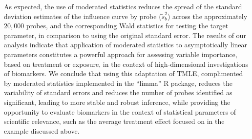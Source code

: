 As expected, the use of moderated statistics reduces the spread of the standard
deviation estimates of the influence curve by probe ($\tilde{s}^2_b$) across the
approximately $20,000$ probes, and the corresponding Wald statistics for testing
the target parameter, in comparison to using the original standard error. The
results of our analysis indicate that application of moderated statistics to
asymptotically linear parameters constitutes a powerful approach for assessing
variable importance, based on treatment or exposure, in the context of
high-dimensional investigations of biomarkers. We conclude that using this
adaptation of TMLE, complimented by moderated statistics implemented in the
``limma'' R package, reduces the variability of standard errors and reduces the
number of probes identified as significant, leading to more stable and robust
inference, while providing the opportunity to evaluate biomarkers in the context
of statistical parameters of scientific relevance, such as the average treatment
effect focused on in the example discussed above.
